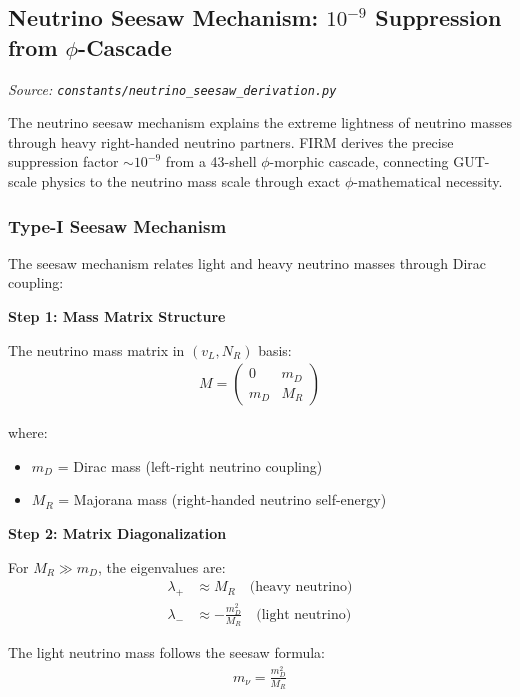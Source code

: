 
\subsection{Neutrino Seesaw Mechanism: $10^{-9}$ Suppression from $\phi$-Cascade}
\textit{Source: \texttt{constants/neutrino\_seesaw\_derivation.py}}

The neutrino seesaw mechanism explains the extreme lightness of neutrino masses through heavy right-handed neutrino partners. FIRM derives the precise suppression factor $\sim 10^{-9}$ from a 43-shell $\phi$-morphic cascade, connecting GUT-scale physics to the neutrino mass scale through exact $\phi$-mathematical necessity.

\subsubsection{Type-I Seesaw Mechanism}

The seesaw mechanism relates light and heavy neutrino masses through Dirac coupling:

\textbf{Step 1: Mass Matrix Structure}

The neutrino mass matrix in $(v_L, N_R)$ basis:
\begin{align}
M = \begin{pmatrix} 0 & m_D \\ m_D & M_R \end{pmatrix}
\end{align}

where:
\begin{itemize}
\item $m_D$ = Dirac mass (left-right neutrino coupling)
\item $M_R$ = Majorana mass (right-handed neutrino self-energy)
\end{itemize}

\textbf{Step 2: Matrix Diagonalization}

For $M_R \gg m_D$, the eigenvalues are:
\begin{align}
\lambda_+ &\approx M_R \quad \text{(heavy neutrino)} \\
\lambda_- &\approx -\frac{m_D^2}{M_R} \quad \text{(light neutrino)}
\end{align}

The light neutrino mass follows the seesaw formula:
\begin{align}
m_\nu = \frac{m_D^2}{M_R} \tag{Type-I Seesaw}
\end{align}

